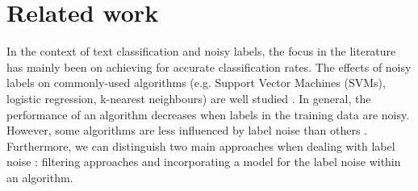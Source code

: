 \documentclass[12pt, a4paper, titlepage]{article}
\begin{document}





							\section{Related work}
							\label{section:related}
In the context of text classification and noisy labels, the focus in the literature has mainly been on achieving for accurate classification rates. The effects of noisy labels on commonly-used algorithms (e.g. Support Vector Machines (SVMs), logistic regression, k-nearest neighbours) are well studied \citep{Pech, Nettleton}. In general, the performance of an algorithm decreases when labels in the training data are noisy. However, some algorithms are less influenced by label noise than others \citep{Frenay}. Furthermore, we can distinguish two main approaches when dealing with label noise \citep{Frenay}: filtering approaches and incorporating a model for the label noise within an algorithm. 
\end{document}
